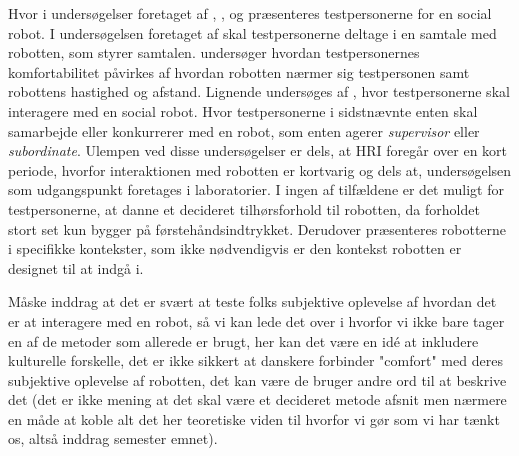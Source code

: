 Hvor i undersøgelser foretaget af \textcite[s. 1480]{PDF:ExploringInfluencingVariable}, \textcite[ss. 190-191]{PDF:PsychologicalEffects}, \textcite[s. 173]{PDF:HowMayIServeYou} og \textcite[ss. 786-787]{PDF:HowSocialDistanceShapesHRI} præsenteres testpersonerne for en social robot. I undersøgelsen foretaget af \textcite[s. 1480]{PDF:ExploringInfluencingVariable} skal testpersonerne deltage i en samtale med robotten, som styrer samtalen. \textcite[ss. 190-191]{PDF:PsychologicalEffects} undersøger hvordan testpersonernes komfortabilitet påvirkes af hvordan robotten nærmer sig testpersonen samt robottens hastighed og afstand. Lignende undersøges af \textcite[s. 173]{PDF:HowMayIServeYou}, hvor testpersonerne skal interagere med en social robot. Hvor testpersonerne i sidstnævnte enten skal samarbejde eller konkurrerer med en robot, som enten agerer \textit{supervisor} eller \textit{subordinate}. \blankline
%
Ulempen ved disse undersøgelser er dels, at HRI foregår over en kort periode, hvorfor interaktionen med robotten er kortvarig og dels at, undersøgelsen som udgangspunkt foretages i laboratorier. I ingen af tilfældene er det muligt for testpersonerne, at danne et decideret tilhørsforhold til robotten, da forholdet stort set kun bygger på førstehåndsindtrykket. Derudover præsenteres robotterne i specifikke kontekster, som ikke nødvendigvis er den kontekst robotten er designet til at indgå i.  

  






%
Måske inddrag at det er svært at teste folks subjektive oplevelse af hvordan det er at interagere med en robot, så vi kan lede det over i hvorfor vi ikke bare tager en af de metoder som allerede er brugt, her kan det være en idé at inkludere kulturelle forskelle, det er ikke sikkert at danskere forbinder "comfort" med deres subjektive oplevelse af robotten, det kan være de bruger andre ord til at beskrive det (det er ikke mening at det skal være et decideret metode afsnit men nærmere en måde at koble alt det her teoretiske viden til hvorfor vi gør som vi har tænkt os, altså inddrag semester emnet).\blankline
%

